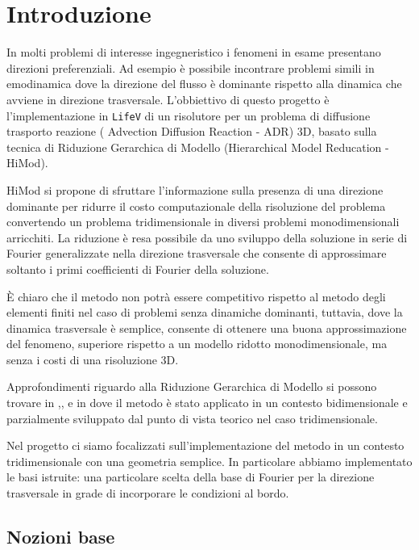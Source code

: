 \chapter{Introduzione}

In molti problemi di interesse ingegneristico i fenomeni in esame presentano
direzioni preferenziali. Ad esempio \`e possibile incontrare problemi simili in 
emodinamica dove la direzione del flusso \`e dominante rispetto alla dinamica
che avviene in direzione trasversale.
L'obbiettivo di questo progetto \`e l'implementazione in \texttt{LifeV} di un 
risolutore per un problema di diffusione trasporto reazione ( Advection Diffusion 
Reaction - ADR) 3D, basato sulla tecnica di Riduzione Gerarchica di Modello
(Hierarchical Model Reducation - HiMod).

HiMod si propone di sfruttare l'informazione
sulla presenza di una direzione dominante per ridurre il costo computazionale
della risoluzione del problema convertendo un problema tridimensionale
in diversi problemi monodimensionali arricchiti.
La riduzione \`e resa possibile da uno sviluppo della soluzione in serie di 
Fourier generalizzate nella direzione trasversale che consente di approssimare 
soltanto i primi coefficienti di Fourier della soluzione.

\`E chiaro che il metodo non potr\`a essere competitivo rispetto al
metodo degli elementi finiti nel caso di problemi senza dinamiche dominanti,
tuttavia, dove la dinamica trasversale \`e semplice, consente di ottenere
una buona approssimazione del fenomeno, superiore rispetto a un modello
ridotto monodimensionale, ma senza i costi di una risoluzione 3D.

Approfondimenti riguardo alla Riduzione Gerarchica di Modello si possono trovare in
\cite{repo08},\cite{repo09},\cite{repo12} e in \cite{tesizilio} dove il metodo \`e stato 
applicato in un contesto bidimensionale e parzialmente sviluppato dal punto di vista
teorico nel caso tridimensionale.

Nel progetto ci siamo focalizzati sull'implementazione del metodo in un contesto 
tridimensionale con una geometria semplice.
In particolare abbiamo implementato le basi istruite: una particolare scelta della base di Fourier
per la direzione trasversale in grade di incorporare le condizioni al bordo.


\section{Nozioni base}

